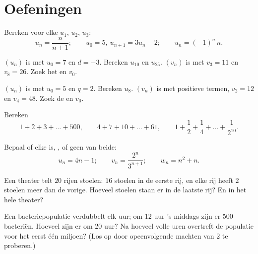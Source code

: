 \section{Oefeningen}

\begin{exercise}[$\star$]\label{exo:g11:seq:1}
Bereken voor elke  $u_1$, $u_2$, $u_3$:
\[
u_n = \frac{n}{n+1}; \qquad
u_0 = 5,\ u_{n+1} = 3u_n - 2; \qquad
u_n = (-1)^n\,n .
\]
\end{exercise}

\begin{exercise}[$\star$]\label{exo:g11:seq:2}
$(u_n)$ is  met $u_0 = 7$ en $d = -3$. Bereken $u_{10}$ en
$u_{25}$. $(v_n)$ is  met $v_3 = 11$ en $v_8 = 26$. Zoek het
 en $v_0$.
\end{exercise}

\begin{exercise}[$\star$]\label{exo:g11:seq:3}
$(u_n)$ is  met $u_0 = 5$ en $q = 2$. Bereken $u_8$. $(v_n)$ is
 met positieve termen, $v_2 = 12$ en $v_4 = 48$. Zoek de  en
$v_0$.
\end{exercise}

\begin{exercise}[$\star$]\label{exo:g11:seq:4}
Bereken
\[
1 + 2 + 3 + \dots + 500, \qquad
4 + 7 + 10 + \dots + 61, \qquad
1 + \frac12 + \frac14 + \dots + \frac{1}{2^{10}} .
\]
\end{exercise}

\begin{exercise}[$\star$]\label{exo:g11:seq:5}
Bepaal of elke   is, , of geen van beide:
\[
u_n = 4n - 1; \qquad
v_n = \frac{2^n}{3^{n+1}}; \qquad
w_n = n^2 + n .
\]
\end{exercise}

\begin{exercise}[$\star\star$]\label{exo:g11:seq:6}
Een theater telt $20$ rijen stoelen: $16$ stoelen in de eerste rij, en elke
rij heeft $2$ stoelen meer dan de vorige. Hoeveel stoelen staan er in de
laatste rij? En in het hele theater?
\end{exercise}

\begin{exercise}[$\star\star$]\label{exo:g11:seq:7}
Een bacteriepopulatie verdubbelt elk uur; om 12 uur 's middags zijn er $500$
bacteriën. Hoeveel zijn er om 20 uur? Na hoeveel volle uren overtreft de
populatie voor het eerst één miljoen? (Los op door opeenvolgende machten van
$2$ te proberen.)
\end{exercise}


